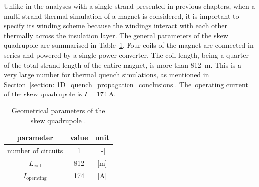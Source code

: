 Unlike in the analyses with a single strand presented in previous chapters, when a multi-strand thermal simulation of a magnet is considered, it is important to specify its winding scheme because the windings interact with each other thermally across the insulation layer. The general parameters of the skew quadrupole are summarised in Table~\ref{table:skew_quad_params_table}. Four coils of the magnet are connected in series and powered by a single power converter. The coil length, being a quarter of the total strand length of the entire magnet, is more than 812~m. This is a very large number for thermal quench simulations, as mentioned in Section~\ref{section: 1D_quench_propagation_conclusions}. The~operating current of the skew quadrupole is $I=174~\text{A}$.

\begin{table}[H]
    \caption{Geometrical parameters of the skew quadrupole \cite{hl_lhc_tech_design_report_v01, marco_prioli_mails}.}
    \vspace{-1.em} 
    \fontsize{10}{10}
    \selectfont 
    \renewcommand{\arraystretch}{1.5}
    \begin{center}
    \begin{tabular}{ ccc }  
    \hline
    parameter & value & unit \\
    \hline
    number of circuits & 1 & [-] \\
    $L_\text{coil}$ & 812 & [m] \\
    $I_\text{operating}$ & 174 & [A] \\
    \hline 
    \end{tabular}
    \end{center}  
     \label{table:skew_quad_params_table} 
 \end{table}